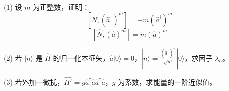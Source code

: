 (1) 设 $m$ 为正整数，证明：
$$[\hat{N}, (\hat{a}^\dagger)^m] = -m(\hat{a}^\dagger)^m~$$ 
$$[\hat{N}, (\hat{a})^m] = m(\hat{a})^m~$$

(2) 若 $|n\rangle$ 是 $\hat{H}$ 的归一化本征矢，$\hat{a}|0\rangle = 0$，$|n\rangle = \frac{(\hat{a}^\dagger)^n}{\sqrt{n!}}|0\rangle$，求因子 $\lambda_n$。

(3) 若外加一微扰，$\hat{H'} = g\hat{a}^\dagger \hat{a} \hat{a}^\dagger \hat{a}$，$g$ 为系数，求能量的一阶近似值。